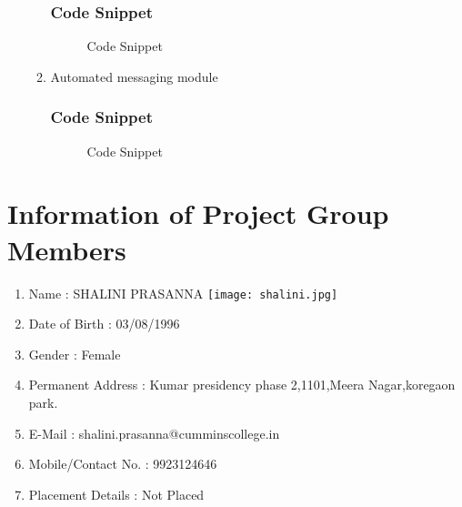 \documentclass[oneside,a4paper,12pt]{book}
\begin{document}
\begin{appendices}
\begin{enumerate}
\begin{enumerate}
\begin{enumerate}[1.]
\end{enumerate}
\newpage
\subsection{Code Snippet}
 \begin{center}
	\begin{figure}[!htbp]
		\centering
		
		
		
	  \caption{Code Snippet}
	  \label{fig:Code Snippet}
	\end{figure}
\end{center}

\item 	Automated messaging module
\newpage
\subsection{Code Snippet}
 \begin{center}
	\begin{figure}[!htbp]
		\centering
		
		
		
	  \caption{Code Snippet}
	  \label{fig:Code Snippet}
	\end{figure}
\end{center}





\end{enumerate}





\end{enumerate}
\chapter{Information of Project Group Members}

\begin{enumerate}
\item Name : SHALINI PRASANNA \hspace{50 mm}\texttt{[image: shalini.jpg]}
\item Date of Birth : 03/08/1996
\item Gender : Female
\item Permanent Address : Kumar presidency phase 2,1101,Meera Nagar,koregaon park.
\item E-Mail : shalini.prasanna@cumminscollege.in
\item Mobile/Contact No. : 9923124646
\item Placement Details : Not Placed



\end{enumerate}
\end{appendices}
\end{document}
